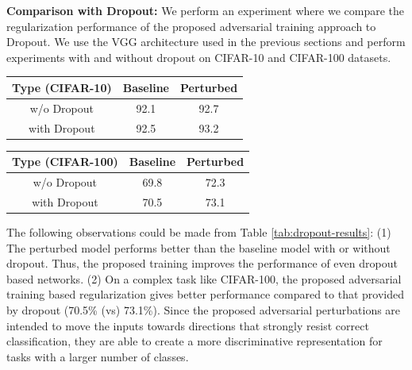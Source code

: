 \textbf{Comparison with Dropout:} We perform an experiment where we compare the regularization performance of the proposed adversarial training approach to Dropout. We use the VGG architecture used in the previous sections and perform experiments with and without dropout on CIFAR-10 and CIFAR-100 datasets. 

\begin{center}
\label{tab:dropout-results}
 \begin{tabular}{||c | c | c ||} 
 \hline
 Type (CIFAR-10) & Baseline & Perturbed \\ [0.5ex] 
 \hline
 w/o Dropout & 92.1 & 92.7  \\ 
 \hline
 with Dropout & 92.5 & 93.2 \\
 \hline  
\end{tabular}
\quad 
\begin{tabular}{||c | c | c ||} 
 \hline
 Type (CIFAR-100) & Baseline & Perturbed \\ [0.5ex] 
 \hline
 w/o Dropout & 69.8 & 72.3  \\ 
 \hline
 with Dropout & 70.5 & 73.1 \\
 \hline  
\end{tabular}
\end{center}

The following observations could be made from Table \ref{tab:dropout-results}: (1) The perturbed model performs better than the baseline model with or without dropout. Thus, the proposed training improves the performance of even dropout based networks. (2) On a complex task like CIFAR-100, the proposed adversarial training based regularization gives better performance compared to that provided by dropout (70.5\% (vs) 73.1\%). Since the proposed adversarial perturbations are intended to move the inputs towards directions that strongly resist correct classification, they are able to create a more discriminative representation for tasks with a larger number of classes. 

\begin{center}
\label{tab:layerwise}
\end{center}

